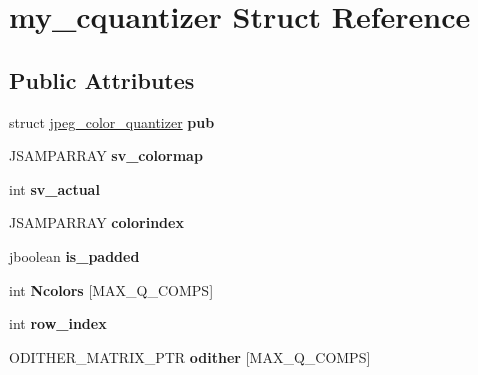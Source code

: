 \hypertarget{structmy__cquantizer}{}\section{my\+\_\+cquantizer Struct Reference}
\label{structmy__cquantizer}
\subsection*{Public Attributes}
\begin{DoxyCompactItemize}
\item 
struct \hyperlink{structjpeg__color__quantizer}{jpeg\+\_\+color\+\_\+quantizer} {\bfseries pub}\hypertarget{structmy__cquantizer_a81f2eb75e01985369a162d52f5086409}{}\label{structmy__cquantizer_a81f2eb75e01985369a162d52f5086409}

\item 
J\+S\+A\+M\+P\+A\+R\+R\+AY {\bfseries sv\+\_\+colormap}\hypertarget{structmy__cquantizer_a9d0cd4d81691db3ec5f01e68fe6537bd}{}\label{structmy__cquantizer_a9d0cd4d81691db3ec5f01e68fe6537bd}

\item 
int {\bfseries sv\+\_\+actual}\hypertarget{structmy__cquantizer_a9fcddbecf01942c4976e271de23effd5}{}\label{structmy__cquantizer_a9fcddbecf01942c4976e271de23effd5}

\item 
J\+S\+A\+M\+P\+A\+R\+R\+AY {\bfseries colorindex}\hypertarget{structmy__cquantizer_a7ec499ccdb9c6983c14edc40453ac1ed}{}\label{structmy__cquantizer_a7ec499ccdb9c6983c14edc40453ac1ed}

\item 
jboolean {\bfseries is\+\_\+padded}\hypertarget{structmy__cquantizer_a17aa4c3305d69fbc551df67f565beaef}{}\label{structmy__cquantizer_a17aa4c3305d69fbc551df67f565beaef}

\item 
int {\bfseries Ncolors} \mbox{[}M\+A\+X\+\_\+\+Q\+\_\+\+C\+O\+M\+PS\mbox{]}\hypertarget{structmy__cquantizer_a6b3c0905a888bd09ee2b8561ad8524c8}{}\label{structmy__cquantizer_a6b3c0905a888bd09ee2b8561ad8524c8}

\item 
int {\bfseries row\+\_\+index}\hypertarget{structmy__cquantizer_a0f10920c096845b912925a98019afc62}{}\label{structmy__cquantizer_a0f10920c096845b912925a98019afc62}

\item 
O\+D\+I\+T\+H\+E\+R\+\_\+\+M\+A\+T\+R\+I\+X\+\_\+\+P\+TR {\bfseries odither} \mbox{[}M\+A\+X\+\_\+\+Q\+\_\+\+C\+O\+M\+PS\mbox{]}\hypertarget{structmy__cquantizer_aaa7e366ab4998e891762cc56f4ada754}{}\label{structmy__cquantizer_aaa7e366ab4998e891762cc56f4ada754}


\end{DoxyCompactItemize}
